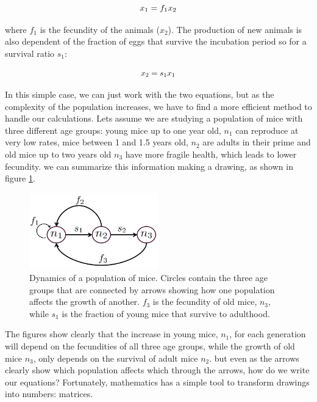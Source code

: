 \documentclass[12pt]{article}
\begin{document}
\begin{equation}
x_1 = f_{1} \\  x_2 
\end{equation}

where $f_1$ is the fecundity of the animals ($x_2$). The production of new animals is also dependent of the fraction of eggs that survive the incubation period so for a survival ratio $s_1$:

\begin{equation}
	x_2 = s_{1} \\  x_1 
\end{equation}

In this simple case, we can just work with the two equations, but as the complexity of the population increases, we have to find a more efficient method to handle our calculations. Lets assume we are studying a population of mice with three different age groups: young  mice up to one year old, $n_1$ can reproduce at very low rates, mice between 1 and 1.5 years old, $n_2$ are adults in their prime and old mice up to two years old $n_3$ have more fragile health, which leads to lower fecundity. we can summarize this information making a drawing, as shown in figure \ref{fig:mice}.

\begin{figure}
	\begin{center}
		\includegraphics[width=0.5\textwidth]{Mouse_pop_graph}
	\end{center}
	\caption{Dynamics of a population of mice. Circles contain the three age groups that are connected by arrows showing how one population affects the growth of another. $f_3$ is the fecundity of old mice, $n_3$, while $s_1$ is the fraction of young mice that survive to adulthood.}
	\label{fig:mice}
\end{figure}
 
The figures show clearly that the increase in young mice, $n_1$, for each generation will depend on the fecundities of all three age groups, while the growth of old mice $n_3$, only depends on the survival of adult mice $n_2$. but even as the arrows clearly show which population affects which through the arrows, how do we write our equations? Fortunately, mathematics has a simple tool to transform drawings into numbers: matrices.
\end{document}
